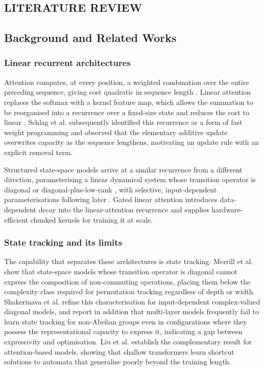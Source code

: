\begin{center}
	\chapter{LITERATURE REVIEW}
\end{center}
\justifying

\section{Background and Related Works}

\subsection{Linear recurrent architectures}

Attention computes, at every position, a weighted combination over the entire
preceding sequence, giving cost quadratic in sequence length \cite{attention}.
Linear attention replaces the softmax with a kernel feature map, which allows the
summation to be reorganised into a recurrence over a fixed-size state and reduces
the cost to linear \cite{lineartransformers}. Schlag et al. \cite{fastweight}
subsequently identified this recurrence as a form of fast weight programming and
observed that the elementary additive update overwrites capacity as the sequence
lengthens, motivating an update rule with an explicit removal term.

Structured state-space models arrive at a similar recurrence from a different
direction, parameterising a linear dynamical system whose transition operator is
diagonal or diagonal-plus-low-rank \cite{s4}, with selective, input-dependent
parameterisations following later \cite{mamba}. Gated linear attention
\cite{gla} introduces data-dependent decay into the linear-attention recurrence
and supplies hardware-efficient chunked kernels for training it at scale.

\subsection{State tracking and its limits}

The capability that separates these architectures is state tracking. Merrill et
al. \cite{illusionofstate} show that state-space models whose transition operator
is diagonal cannot express the composition of non-commuting operations, placing
them below the complexity class required for permutation tracking regardless of
depth or width. Shakerinava et al. \cite{diagonalssm} refine this
characterisation for input-dependent complex-valued diagonal models, and report
in addition that multi-layer models frequently fail to learn state tracking for
non-Abelian groups even in configurations where they possess the representational
capacity to express it, indicating a gap between expressivity and optimisation.
Liu et al. \cite{shortcuts} establish the complementary result for
attention-based models, showing that shallow transformers learn shortcut
solutions to automata that generalise poorly beyond the training length.

